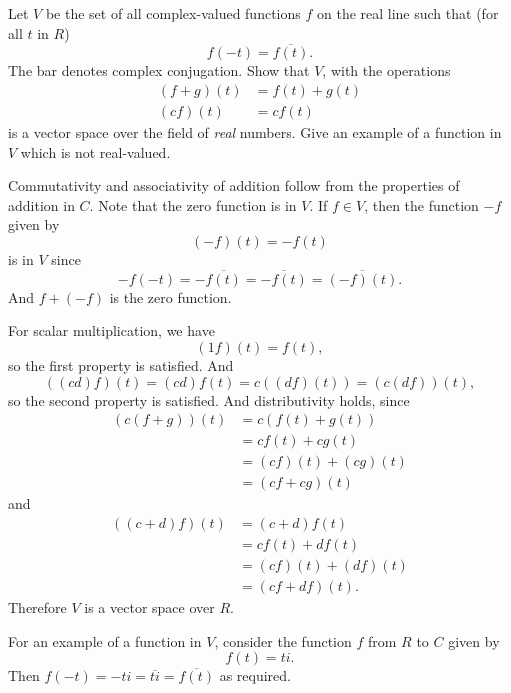  Let $V$ be the set of all complex-valued functions $f$ on
the real line such that (for all $t$ in $R$)
\begin{equation*}
  f(-t) = \overline{f(t)}.
\end{equation*}
The bar denotes complex conjugation. Show that $V$, with the
operations
\begin{align*}
  (f + g)(t) &= f(t) + g(t) \\
  (cf)(t) &= cf(t)
\end{align*}
is a vector space over the field of {\em real} numbers. Give an
example of a function in $V$ which is not real-valued.
\begin{solution}
  Commutativity and associativity of addition follow from the
  properties of addition in $C$. Note that the zero function is in
  $V$. If $f\in V$, then the function $-f$ given by
  \begin{equation*}
    (-f)(t) = -f(t)
  \end{equation*}
  is in $V$ since
  \begin{equation*}
    -f(-t) = -\overline{f(t)}
    = \overline{-f(t)} = \overline{(-f)(t)}.
  \end{equation*}
  And $f + (-f)$ is the zero function.

  For scalar multiplication, we have
  \begin{equation*}
    (1f)(t) = f(t),
  \end{equation*}
  so the first property is satisfied. And
  \begin{equation*}
    ((cd)f)(t) = (cd)f(t) = c((df)(t)) = (c(df))(t),
  \end{equation*}
  so the second property is satisfied. And distributivity holds, since
  \begin{align*}
    (c(f + g))(t) &= c(f(t) + g(t)) \\
                  &= cf(t) + cg(t) \\
                  &= (cf)(t) + (cg)(t) \\
                  &= (cf + cg)(t)
  \end{align*}
  and
  \begin{align*}
    ((c + d)f)(t) &= (c + d)f(t) \\
                  &= cf(t) + df(t) \\
                  &= (cf)(t) + (df)(t) \\
                  &= (cf + df)(t).
  \end{align*}
  Therefore $V$ is a vector space over $R$.

  For an example of a function in $V$, consider the function $f$ from
  $R$ to $C$ given by
  \begin{equation*}
    f(t) = ti.
  \end{equation*}
  Then $f(-t) = -ti = \overline{ti} = \overline{f(t)}$ as required.
\end{solution}
